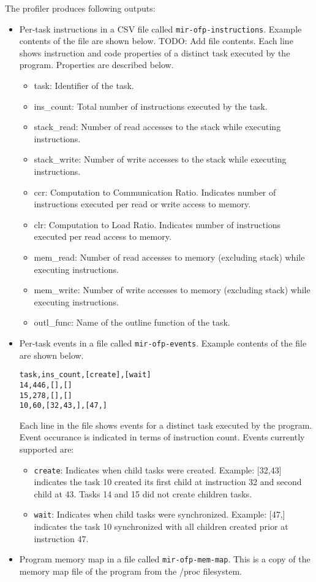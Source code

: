 \documentclass[11pt,a4paper]{article}
\begin{document}
The profiler produces following outputs: 
\begin{itemize}
    \item Per-task instructions in a CSV file called \texttt{mir-ofp-instructions}. Example contents of the file are shown below.  TODO: Add file contents.  Each line shows instruction and code properties of a distinct task executed by the program. Properties are described below.
        \begin{itemize}
            \item task: Identifier of the task.       
            \item ins\_count: Total number of instructions executed by the task. 
            \item stack\_read: Number of read accesses to the stack while executing instructions.
            \item stack\_write: Number of write accesses to the stack while executing instructions.
            \item ccr: Computation to Communication Ratio. Indicates number of instructions executed per read or write access to memory.
            \item clr: Computation to Load Ratio. Indicates number of instructions executed per read access to memory.
            \item mem\_read: Number of read accesses to memory (excluding stack) while executing instructions.
            \item mem\_write: Number of write accesses to memory (excluding stack) while executing instructions.
            \item outl\_func: Name of the outline function of the task.
        \end{itemize}
    \item Per-task events in a file called \texttt{mir-ofp-events}. Example contents of the file are shown below. 
\begin{lstlisting}[style=MyInputStyle]
task,ins_count,[create],[wait]
14,446,[],[]
15,278,[],[]
10,60,[32,43,],[47,]
\end{lstlisting}
        Each line in the file shows events for a distinct task executed by the program. Event occurance is indicated in terms of instruction count. Events currently supported are: 
        \begin{itemize}
            \item \texttt{create}: Indicates when child tasks were created. Example: [32,43] indicates the task 10 created its first child at instruction 32 and second child at 43. Tasks 14 and 15 did not create children tasks.
            \item \texttt{wait}: Indicates when child tasks were synchronized. Example: [47,] indicates the task 10 synchronized with all children created prior at instruction 47. 
        \end{itemize}
    \item Program memory map in a file called \texttt{mir-ofp-mem-map}. This is a copy of the memory map file of the program from the /proc filesystem.
\end{itemize}
\end{document}
